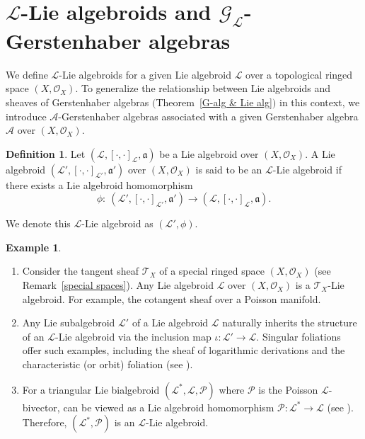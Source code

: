 \documentclass[pdftex]{sigma}
\numberwithin{equation}{section}
\theoremstyle{definition}
\newtheorem{Def}[Thm]{Definition}
\newtheorem{Exm}[Thm]{Example}
\begin{document}
\section[L-Lie algebroids and G\_L-Gerstenhaber algebras]{$\boldsymbol{\mathcal{L}}$-Lie algebroids and $\boldsymbol{\mathcal{G}_{\mathcal{L}}}$-Gerstenhaber algebras}
\label{Sec 3}

We define $\mathcal{L}$-Lie algebroids for a given Lie algebroid $\mathcal{L}$ over a topological ringed space $(X, \mathcal{O}_X)$. To generalize the relationship between Lie algebroids and sheaves of Gerstenhaber algebras $($Theorem~\ref{G-alg & Lie alg}$)$ in this context, we introduce $\mathcal{A}$-Gerstenhaber algebras associated with a given Gerstenhaber algebra $\mathcal{A}$ over $(X, \mathcal{O}_X)$.

\begin{Def} \label{L-Lie algebroids} Let $(\mathcal{L}, [\cdot,\cdot]_{\mathcal{L}}, \mathfrak{a})$ be a Lie algebroid over $(X, \mathcal{O}_X)$. A Lie algebroid $(\mathcal{L'}, [\cdot,\cdot]_{\mathcal{L'}}, \mathfrak{a'})$ over $(X, \mathcal{O}_X)$ is said to be an $\mathcal{L}$-Lie algebroid if there exists a Lie algebroid homomorphism
\[
\phi\colon \ (\mathcal{L'}, [\cdot,\cdot]_{\mathcal{L'}}, \mathfrak{a'}) \rightarrow (\mathcal{L}, [\cdot,\cdot]_{\mathcal{L}}, \mathfrak{a}).
\]
	
	We denote this $\mathcal{L}$-Lie algebroid as $(\mathcal{L'},\phi)$.
\end{Def}

\begin{Exm}\quad
\begin{enumerate}\itemsep=0pt
	\item Consider the tangent sheaf $\mathcal{T}_X$ of a special ringed space $(X,\mathcal{O}_X)$ (see Remark~\ref{special spaces}). Any Lie algebroid $\mathcal{L}$ over $(X,\mathcal{O}_X)$ is a $\mathcal{T}_X$-Lie algebroid. For example, the cotangent sheaf over a Poisson manifold.
	\item Any Lie subalgebroid $\mathcal{L}'$ of a Lie algebroid $\mathcal{L}$ naturally inherits the structure of an $\mathcal{L}$-Lie algebroid via the inclusion map $\iota\colon \mathcal{L}' \to \mathcal{L}$. Singular foliations offer such examples, including the sheaf of logarithmic derivations and the characteristic (or orbit) foliation (see \cite{RF, BP}).
	
	\item For a triangular Lie bialgebroid $(\mathcal{L}^*, \mathcal{L}, \mathcal{P})$ where $\mathcal{P}$ is the Poisson $\mathcal{L}$-bivector, can be viewed as a Lie algebroid homomorphism $\mathcal{P}\colon \mathcal{L}^* \rightarrow \mathcal{L}$ (see \cite{KS}). Therefore, $(\mathcal{L}^*, \mathcal{P})$ is an $\mathcal{L}$-Lie algebroid.
\end{enumerate}
\end{Exm}
\end{document}
